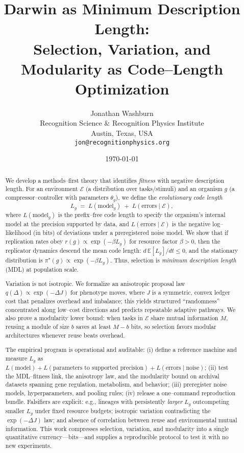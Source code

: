 \documentclass[11pt,a4paper]{article}
\title{\vspace{-0.5em}\sffamily\bfseries
Darwin as Minimum Description Length:\\[0.25em]
Selection, Variation, and Modularity as Code--Length Optimization
\vspace{0.2em}}
\author{\sffamily Jonathan Washburn\\[0.25em]
\small Recognition Science \& Recognition Physics Institute\\
\small Austin, Texas, USA\\
\small \texttt{jon@recognitionphysics.org}}
\date{\sffamily \today}
\newcommand{\E}{\mathbb{E}}
\begin{document}
\maketitle
\vspace{-1.2em}

\begin{abstract}
\noindent
We develop a methods--first theory that identifies \emph{fitness} with negative description length. For an environment $\mathcal{E}$ (a distribution over tasks/stimuli) and an organism $g$ (a compressor--controller with parameters $\theta_g$), we define the \emph{evolutionary code length}
\[
L_g \;=\; L(\text{model}_g)\;+\;L(\text{errors}\mid \mathcal{E}),
\]
where $L(\text{model}_g)$ is the prefix--free code length to specify the organism's internal model at the precision supported by data, and $L(\text{errors}\mid \mathcal{E})$ is the negative log--likelihood (in bits) of deviations under a preregistered noise model. We show that if replication rates obey $r(g)\propto \exp(-\beta L_g)$ for resource factor $\beta>0$, then the replicator dynamics descend the mean code length: $d\,\E[L_g]/dt\le 0$, and the stationary distribution is $\pi^\star(g)\propto \exp(-\beta L_g)$. Thus, selection is \emph{minimum description length} (MDL) at population scale.

Variation is not isotropic. We formalize an anisotropic proposal law $q(\Delta)\propto \exp(-\Delta J)$ for phenotype moves, where $J$ is a symmetric, convex ledger cost that penalizes overhead and imbalance; this yields structured ``randomness'' concentrated along low--cost directions and predicts repeatable adaptive pathways. We also prove a modularity lower bound: when tasks in $\mathcal{E}$ share mutual information $M$, reusing a module of size $b$ saves at least $M-b$ bits, so selection favors modular architectures whenever reuse beats overhead.

The empirical program is operational and auditable: (i) define a reference machine and measure $L_g$ as $L(\text{model})+L(\text{parameters to supported precision})+L(\text{errors}\mid\text{noise})$; (ii) test the MDL--fitness link, the anisotropy law, and the modularity bound on archival datasets spanning gene regulation, metabolism, and behavior; (iii) preregister noise models, hyperparameters, and pooling rules; (iv) release a one--command reproduction bundle. Falsifiers are explicit: e.g., lineages with persistently \emph{larger} $L_g$ outcompeting smaller $L_g$ under fixed resource budgets; isotropic variation contradicting the $\exp(-\Delta J)$ law; and absence of correlation between reuse and environmental mutual information. This work compresses selection, variation, and modularity into a single quantitative currency---bits---and supplies a reproducible protocol to test it with no new experiments.
\end{abstract}
\end{document}
